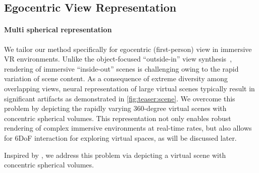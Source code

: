 


\subsection{Egocentric View Representation}
\label{sec:method:representation}
\paragraph{Multi spherical representation}
We tailor our method specifically for egocentric (first-person) view in immersive VR environments.
Unlike the object-focused ``outside-in'' view synthesis~\cite{sitzmann2019deepvoxels,mildenhall2020nerf}, rendering of immersive ``inside-out'' scenes is challenging owing to the rapid variation of scene content. As a consequence of extreme diversity among overlapping views, neural representation of large virtual scenes typically result in significant artifacts as demonstrated in \cref{fig:teaser:scene}. 
We overcome this problem by depicting the rapidly varying 360-degree virtual scenes with concentric spherical volumes. This representation not only enables robust rendering of complex immersive environments at real-time rates, but also allows for 6DoF interaction for exploring virtual spaces, as will be discussed later.


Inspired by \cite{Broxton:immersiveLF,Lin:DeepPanorama}, we address this problem via depicting a virtual scene with concentric spherical volumes.  

